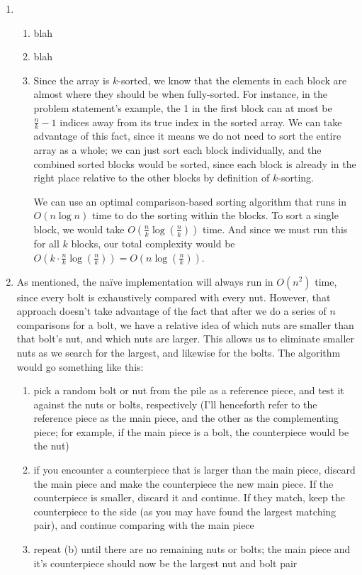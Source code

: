 \documentclass[12pt]{article}
\begin{document}
\begin{enumerate}
    \item 
    \begin{enumerate}
        \item blah
        \item blah
        \item Since the array is $k$-sorted, we know that the elements in each block are almost where they should be when 
        fully-sorted. For instance, in the problem statement's example, the 1 in the first block can at most be $\frac{n}{k}-1$ indices 
        away from its true index in the sorted array. We can take advantage of this fact, since it means we do not need to 
        sort the entire array as a whole; we can just sort each block individually, and the combined sorted blocks would be 
        sorted, since each block is already in the right place relative to the other blocks by definition of $k$-sorting.

        We can use an optimal comparison-based sorting algorithm that runs in $O(n\log n)$ time to do the sorting within the blocks. 
        To sort a single block, we would take $O(\frac{n}{k}\log{(\frac{n}{k})})$ time. And since we must run this for 
        all $k$ blocks, our total complexity would be $O(k \cdot \frac{n}{k}\log{(\frac{n}{k})}) = O(n\log(\frac{n}{k}))$.
    \end{enumerate}
    
    \item As mentioned, the naïve implementation will always run in $O(n^2)$ time, since every bolt is exhaustively 
    compared with every nut. However, that approach doesn't take advantage of the fact that after we do a series of $n$ 
    comparisons for a bolt, we have a relative idea of which nuts are smaller than that bolt's nut, and which nuts are 
    larger. This allows us to eliminate smaller nuts as we search for the largest, and likewise for the bolts. The algorithm 
    would go something like this:

    \begin{enumerate}
        \item pick a random bolt or nut from the pile as a reference piece, and test it against the nuts or bolts, respectively 
        (I'll henceforth refer to the reference piece as the main piece, and the other as the complementing piece; for example, if the main piece is 
        a bolt, the counterpiece would be the nut)
        \item if you encounter a counterpiece that is larger than the main piece, discard the main piece and make the counterpiece 
        the new main piece. If the counterpiece is smaller, discard it and continue. If they match, keep the counterpiece to the side 
        (as you may have found the largest matching pair), and continue comparing with the main piece
        \item repeat (b) until there are no remaining nuts or bolts; the main piece and it's counterpiece should now be the 
        largest nut and bolt pair
    \end{enumerate}


\end{enumerate}
\end{document}
